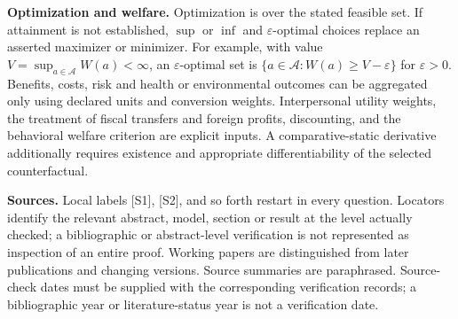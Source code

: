 \documentclass[11pt,a4paper]{article}
\begin{document}
\textbf{Optimization and welfare.} Optimization is over the stated feasible set. If attainment is not established, $\sup$ or $\inf$ and $\varepsilon$-optimal choices replace an asserted maximizer or minimizer. For example, with value $V=\sup_{a\in\mathcal A}W(a)<\infty$, an $\varepsilon$-optimal set is $\{a\in\mathcal A:W(a)\geq V-\varepsilon\}$ for $\varepsilon>0$. Benefits, costs, risk and health or environmental outcomes can be aggregated only using declared units and conversion weights. Interpersonal utility weights, the treatment of fiscal transfers and foreign profits, discounting, and the behavioral welfare criterion are explicit inputs. A comparative-static derivative additionally requires existence and appropriate differentiability of the selected counterfactual.

\textbf{Sources.} Local labels [S1], [S2], and so forth restart in every question. Locators identify the relevant abstract, model, section or result at the level actually checked; a bibliographic or abstract-level verification is not represented as inspection of an entire proof. Working papers are distinguished from later publications and changing versions. Source summaries are paraphrased. Source-check dates must be supplied with the corresponding verification records; a bibliographic year or literature-status year is not a verification date.
\end{document}
